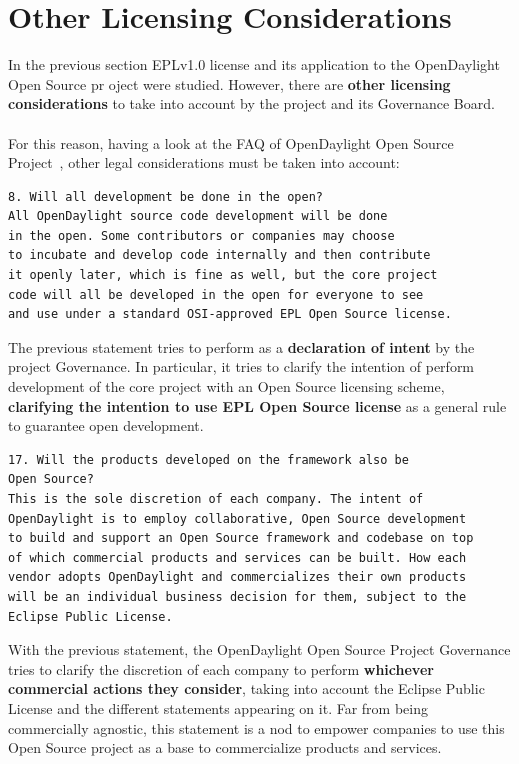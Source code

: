 \documentclass[a4paper, 12pt]{book}
\begin{document}
\section{Other Licensing Considerations}
\label{sec:otherlicenseconsiderations}

In the previous section EPLv1.0 license and its application to the OpenDaylight Open Source pr oject were studied. However, there are \textbf{other licensing considerations} to take into account by the project and its Governance Board.\\
\\
For this reason, having a look at the FAQ of OpenDaylight Open Source Project~\cite{OpenDaylightFAQ}, other legal considerations must be taken into account:

\begin{verbatim}
8. Will all development be done in the open?
All OpenDaylight source code development will be done
in the open. Some contributors or companies may choose
to incubate and develop code internally and then contribute
it openly later, which is fine as well, but the core project
code will all be developed in the open for everyone to see
and use under a standard OSI-approved EPL Open Source license.
\end{verbatim}
The previous statement tries to perform as a \textbf{declaration of intent} by the project Governance. In particular, it tries to clarify the intention of perform development of the core project with an Open Source licensing scheme, \textbf{clarifying the intention to use EPL Open Source license} as a general rule to guarantee open development.

\begin{verbatim}
17. Will the products developed on the framework also be
Open Source?
This is the sole discretion of each company. The intent of
OpenDaylight is to employ collaborative, Open Source development
to build and support an Open Source framework and codebase on top
of which commercial products and services can be built. How each
vendor adopts OpenDaylight and commercializes their own products
will be an individual business decision for them, subject to the
Eclipse Public License.
\end{verbatim}
With the previous statement, the OpenDaylight Open Source Project Governance tries to clarify the discretion of each company to perform \textbf{whichever commercial actions they consider}, taking into account the Eclipse Public License and the different statements appearing on it. Far from being commercially agnostic, this statement is a nod to empower companies to use this Open Source project as a base to commercialize products and services.
\end{document}
